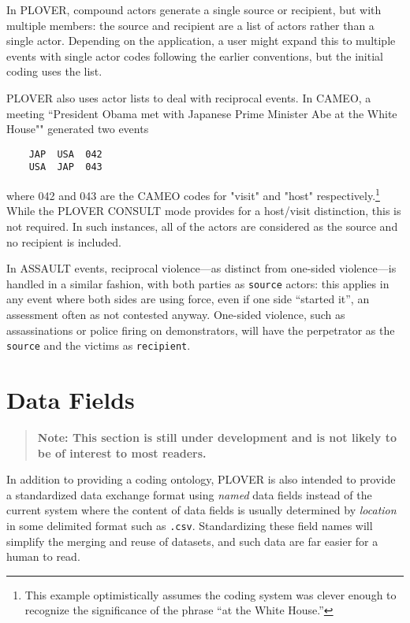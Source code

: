 \documentclass[11pt]{report}
\newcommand{\plcat}[1]{\textsf{#1}}
\newcommand{\ti}[1]{\textit{#1}}
\newcommand{\txt}[1]{\texttt{#1}}
\begin{document}
In PLOVER, compound actors generate a single source or recipient, but with multiple members: the source and recipient are a list of actors rather than a single actor. Depending on the application, a user might expand this to multiple events with single actor codes following the earlier conventions, but the initial coding uses the list.

PLOVER also uses actor lists to deal with reciprocal events. In CAMEO, a meeting ``President Obama met with Japanese Prime Minister Abe at the White House"" generated two events
\begin{verbatim}
	JAP  USA  042
	USA  JAP  043
\end{verbatim}
where 042 and 043 are the CAMEO codes for "visit" and "host" respectively.\footnote{This example optimistically assumes the coding system was clever enough to recognize the significance of the phrase ``at the White House.''} While the PLOVER \plcat{CONSULT} mode provides for a host/visit distinction, this is not required. In such instances, all of the actors are considered as the source and no recipient is included.

In \plcat{ASSAULT} events, reciprocal violence---as distinct from one-sided violence---is handled in a similar fashion, with both parties as \texttt{source} actors: this applies in any event where both sides are using force, even if one side ``started it'', an assessment often as not contested anyway. One-sided violence, such as assassinations or police firing on demonstrators, will have the perpetrator as the \texttt{source} and the victims as \texttt{recipient}.



\chapter{Data Fields}

\begin{quote}
\textbf{Note: This section is still under development and is not likely to be of interest to most readers.}

\end{quote}
\bigskip

In addition to providing a coding ontology, PLOVER is also intended to provide a standardized data exchange format using \ti{named} data fields instead of the current system where the content of data fields is usually determined by \ti{location} in some delimited format such as \txt{.csv}. Standardizing these field names will simplify the merging and reuse of datasets, and such data are far easier for a human to read. 
\end{document}
